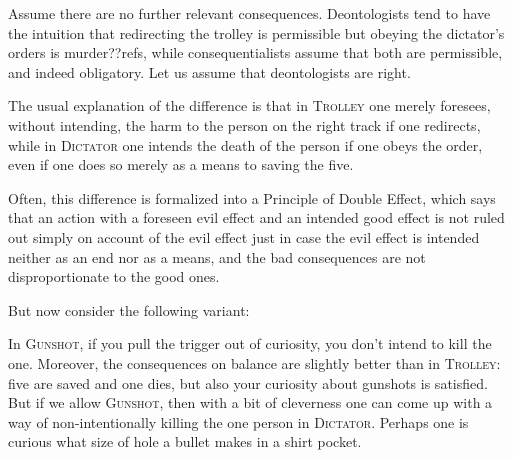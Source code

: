     
    
Assume there are no further relevant consequences.  Deontologists tend to have the intuition that redirecting 
the trolley is permissible but obeying the dictator's orders is murder??refs, while consequentialists assume 
that both are permissible, and indeed obligatory. Let us assume that deontologists are right.

The usual explanation of the difference is that in \textsc{Trolley} one merely foresees, without intending, the 
harm to the person on the right track if one redirects, while in \textsc{Dictator} one intends the death of the person
if one obeys the order, even if one does so merely as a means to saving the five. 

Often, this difference is formalized into a Principle of Double Effect, which says that an action with a foreseen
evil effect and an intended good effect is not ruled out simply on account of the evil effect just in case the evil effect is 
intended neither as an end nor as a means, and the bad consequences are not disproportionate to the good ones.

But now consider the following variant:

    
In \textsc{Gunshot}, if you pull the trigger out of curiosity, you don't intend to kill the one. Moreover, the consequences
on balance are slightly better than in \textsc{Trolley}: five are saved and one dies, but also your curiosity about gunshots is
satisfied. But if we allow \textsc{Gunshot}, then with a bit of cleverness one can come up with a way of non-intentionally
killing the one person in \textsc{Dictator}. Perhaps one is curious what size of hole a bullet makes in a shirt pocket. 

